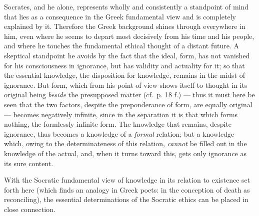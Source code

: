 Socrates, and he alone, represents wholly and consistently a standpoint of mind that lies as a consequence in the
Greek fundamental view and is completely explained by it.
Therefore the Greek background shines through everywhere in him, even where he seems to depart most decisively from
his time and his people, and where he touches the fundamental ethical thought of a distant
future. A skeptical standpoint he avoids
by the fact that the ideal, form, has not vanished for his consciousness in ignorance, but has validity and actuality
for it; so that the essential knowledge, the disposition for knowledge, remains
in the midst of ignorance. But form, which from his point of view
shows itself to thought in its original being \emph{beside} the
presupposed matter (cf.\ p. 18 f.) --- thus it must here be seen that
the two factors, despite the preponderance of form, are equally original ---
becomes negatively infinite, since in the separation it is that which
forms nothing, the formlessly infinite form. The knowledge
that remains, despite ignorance, thus becomes a knowledge of a
\emph{formal} relation; but a knowledge which, owing to the determinateness of this relation, \emph{cannot} be filled out in the knowledge of the
actual, and, when it turns toward this, gets only ignorance as its sure content.

With the Socratic fundamental view of knowledge in
its relation to existence set forth here (which finds an analogy in Greek
poets: in the conception of death as reconciling), the
essential determinations of the Socratic ethics can be placed in close connection.


